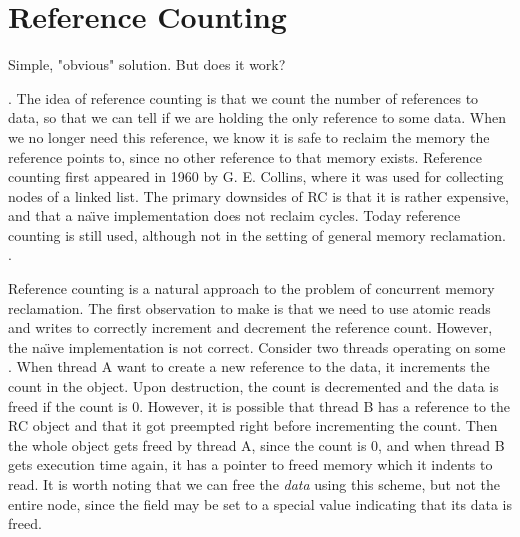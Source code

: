 \documentclass[b5paper]{report}
\begin{document}
\section{Reference Counting}
Simple, "obvious" solution. But does it work?

. The idea of reference counting is that we count the number of references
to data, so that we can tell if we are holding the only reference to some
data. When we no longer need this reference, we know it is safe to reclaim the
memory the reference points to, since no other reference to that memory
exists. Reference counting first appeared in 1960 by G. E.
Collins\cite{collins1960method}, where it was used for collecting nodes of a
linked list. The primary downsides of RC is that it is rather expensive, and
that a na\"\i{}ve implementation does not reclaim cycles. Today reference
counting is still used, although not in the setting of general memory
reclamation.  .

%

 Reference counting
is a natural approach to the problem of concurrent memory reclamation. The
first observation to make is that we need to use atomic reads and writes to
correctly increment and decrement the reference count. However, the na\"\i{}ve
implementation is not correct. Consider two threads operating on some
. When thread A want to create a new reference to the data, it
increments the count in the  object. Upon destruction, the count is
decremented and the data is freed if the count is 0. However, it is possible
that thread B has a reference to the RC object and that it got preempted right
before incrementing the count. Then the whole object gets freed by thread A,
since the count is 0, and when thread B gets execution time again, it has a
pointer to freed memory which it indents to read. It is worth noting that we
can free the \emph{data} using this scheme, but not the entire  node,
since the  field may be set to a special value indicating that its
data is freed.
\end{document}
